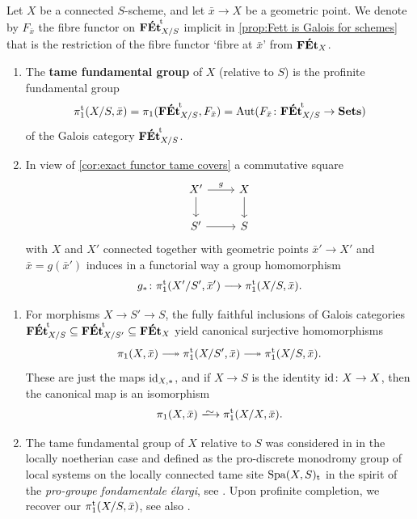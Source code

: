\begin{defi}
\label{defi:tamepi1 schemes}
    Let $X$ be a connected $S$-scheme, and let $\bar x \to X$ be a geometric point. We denote by $F_{\bar x}$ the fibre functor on ${\mathbf{F\acute{E}t}}^{\!\mathrm{t}}_{X/S}$ implicit in \cref{prop:Fett is Galois for schemes} that is the restriction of the fibre functor `fibre at $\bar x$' from $\mathbf{F\acute{E}t}_X$.     
    \begin{enumerate}
        \item 
        The \textbf{tame fundamental group} of $X$ (relative to $S$) is the profinite fundamental group  
        \[
        \pi_1^{\mathrm{t}}(X/S,\bar x) = \pi_1({\mathbf{F\acute{E}t}}^{\!\mathrm{t}}_{X/S}, F_{\bar x}) = \operatorname{Aut}(F_{\bar x} \colon {\mathbf{F\acute{E}t}}^{\!\mathrm{t}}_{X/S} \to \mathbf{Sets})
        \]
        of the Galois category ${\mathbf{F\acute{E}t}}^{\!\mathrm{t}}_{X/S}$. 
        \item
        In view of \cref{cor:exact functor tame covers} a    commutative square
        \[ 
        \begin{tikzcd}
            X'\ar[d] \ar[r,"g"] & X\ar[d] \\
            S'\ar[r] & S
        \end{tikzcd}
        \]
        with $X$ and $X'$ connected together with geometric points $\bar x' \to X'$ and $\bar x = g(\bar x')$ induces in a functorial way a group homomorphism
        \[
        g_\ast \colon \pi_1^{\mathrm{t}}(X'/S',\bar x')  \longrightarrow \pi_1^{\mathrm{t}}(X/S,\bar x).
        \]
\end{enumerate}
\end{defi}

\begin{rmks}
    \begin{enumerate}
        \item 
        For morphisms $X \to S' \to S$, the fully faithful inclusions of Galois categories ${\mathbf{F\acute{E}t}}^{\!\mathrm{t}}_{X/S}  \subseteq {\mathbf{F\acute{E}t}}^{\!\mathrm{t}}_{X/S'}  \subseteq\mathbf{F\acute{E}t}_X$ yield canonical surjective homomorphisms
        \[
        \pi_1(X,\bar x) \surj \pitame(X/S',\bar x) \surj \pitame(X/S,\bar x).
        \]
        These are just the maps $\operatorname{id}_{X,\ast}$, and if $X \to S$ is the 
        identity $\operatorname{id}\colon X \to X$, then the canonical map is an isomorphism
        \[
        \pi_1(X,\bar x) \isomto \pitame(X/X,\bar x).
        \]
     
        \item 
        The tame fundamental group of $X$ relative to $S$ was considered in \cite[\S5]{HubnerSchmidt2021:TameSiteSchemea} in the locally noetherian case and defined as the pro-discrete monodromy group of local systems on the locally connected tame site $\operatorname{Spa}(X,S)_{{\rm t}}$ in the spirit of the \emph{pro-groupe fondamentale \'elargi}, see \cite[X~\S6]{SGA3:2}.  Upon profinite completion, we recover our $\pi_1^{\mathrm{t}}(X/S,\bar x)$, see  also \cite[\S9]{Hubner2021:AdicTameSite}.      
    \end{enumerate}
\end{rmks}

